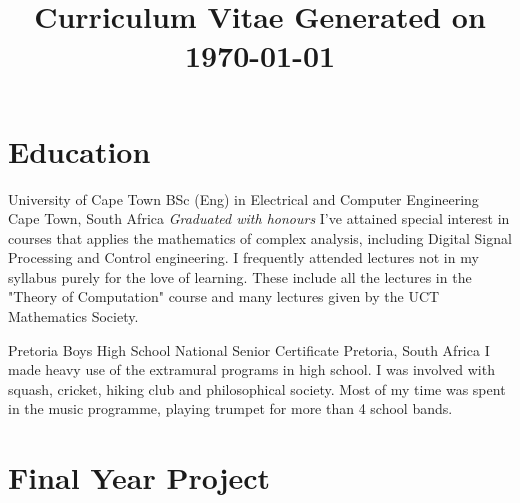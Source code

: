 \documentclass[10pt,a4paper,sans]{moderncv}
\title{Curriculum Vitae \newline\null\hfill\small Generated on \today}
\begin{document}
\makecvtitle


\section{Education}

{University of Cape Town}
{BSc (Eng) in Electrical and Computer Engineering}
{\newline Cape Town, South Africa}
{\textit{Graduated with honours}}
{I've attained special interest in courses that applies the mathematics of complex
analysis, including Digital Signal Processing and Control engineering. I
frequently attended lectures not in my syllabus purely for the love of learning.
These include all the lectures in the "Theory of Computation" course and many
lectures given by the UCT Mathematics Society.}

\vspace{2mm}
{Pretoria Boys High School}
{National Senior Certificate}
{\newline Pretoria, South Africa}
{}
{I made heavy use of the extramural programs in high school. I was involved with
squash, cricket, hiking club and philosophical society. Most of my time was spent
in the music programme, playing trumpet for more than 4 school bands.}

\section{Final Year Project}
\end{document}
